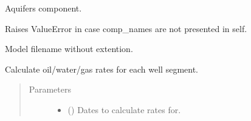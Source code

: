 \documentclass[letterpaper,10pt,english]{sphinxmanual}
\begin{document}
\begin{fulllineitems}
\begin{quote}
\begin{description}
\begin{itemize}
\end{itemize}

\end{description}\end{quote}

\begin{fulllineitems}
\label{\detokenize{api/field:geology.src.Field.aquifers}}
Aquifers component.

\end{fulllineitems}


\begin{fulllineitems}
\label{\detokenize{api/field:geology.src.Field.assert_components_available}}
Raises ValueError in case comp\_names are not presented in self.

\end{fulllineitems}


\begin{fulllineitems}
\label{\detokenize{api/field:geology.src.Field.basename}}
Model filename without extention.

\end{fulllineitems}


\begin{fulllineitems}
\label{\detokenize{api/field:geology.src.Field.calculate_rates}}
Calculate oil/water/gas rates for each well segment.
\begin{quote}\begin{description}
\item[{Parameters}] \leavevmode\begin{itemize}
\item {} 
 () \textendash{} Dates to calculate rates for.


\end{itemize}
\end{description}
\end{quote}
\end{fulllineitems}
\end{fulllineitems}
\end{document}
